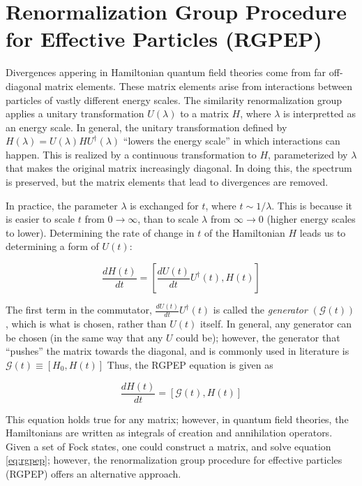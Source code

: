 \section{Renormalization Group Procedure for Effective Particles (RGPEP)}
\label{sec:rgpep}

Divergences appering in Hamiltonian quantum field theories come from far off-diagonal matrix elements. 
These matrix elements arise from interactions between particles of vastly different energy scales. \cite{}
The similarity renormalization group \cite{} applies a unitary transformation $U(\lambda)$ to a matrix $H$, where $\lambda$ is interpretted as an energy scale. 
In general, the unitary transformation defined by $H(\lambda) = U(\lambda)HU^\dagger(\lambda)$ ``lowers the energy scale'' in which interactions can happen. 
This is realized by a continuous transformation to $H$, parameterized by $\lambda$ that makes the original matrix increasingly diagonal. 
In doing this, the spectrum is preserved, but the matrix elements that lead to divergences are removed.

In practice, the parameter $\lambda$ is exchanged for $t$, where $t \sim 1/\lambda$. 
This is because it is easier to scale $t$ from $0 \rightarrow \infty$, than to scale $\lambda$ from $\infty \rightarrow 0$ (higher energy scales to lower).
Determining the rate of change in $t$ of the Hamiltonian $H$ leads us to determining a form of $U(t)$:

\begin{equation}
    \label{eq:rgpep-ut}
    \frac{dH(t)}{dt} = \left[\frac{dU(t)}{dt}U^\dagger(t), H(t) \right]
\end{equation}

The first term in the commutator, $\frac{dU(t)}{dt}U^\dagger(t)$ is called the \textit{generator} $\left(\mathcal{G}(t) \right)$, which is what is chosen, rather than $U(t)$ itself.
In general, any generator can be chosen (in the same way that any $U$ could be); however, the generator that ``pushes'' the matrix towards the diagonal, and is commonly used in literature is $\mathcal{G}(t) \equiv \left[H_0, H(t) \right]$
Thus, the RGPEP equation is given as 

\begin{equation}
    \label{eq:rgpep}
    \frac{dH(t)}{dt} = \left[\mathcal{G}(t), H(t) \right]
\end{equation}

This equation holds true for any matrix; however, in quantum field theories, the Hamiltonians are written as integrals of creation and annihilation operators. 
Given a set of Fock states, one could construct a matrix, and solve equation \ref{eq:rgpep}; however, the renormalization group procedure for effective particles (RGPEP) \cite{} offers an alternative approach.

